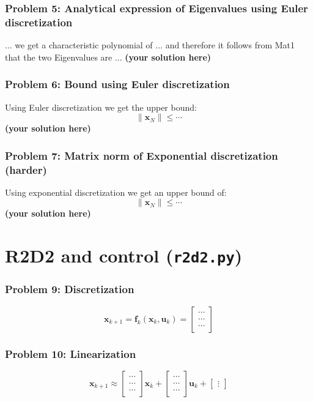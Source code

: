 \documentclass[12pt,twoside]{article}
\newcommand\redt[1]{ {\textcolor[rgb]{0.60, 0.00, 0.00}{\textbf{ #1} } } }
\newcommand{\m}[1]{\boldsymbol{ #1}}
\newcommand{\yoursolution}{ \redt{(your solution here) } }
\begin{document}
\subsubsection*{{\color{red}Problem 5:  Analytical expression of Eigenvalues using Euler discretization}}

... we get a characteristic polynomial of ... and therefore it follows from Mat1 that the two Eigenvalues are ... 
\yoursolution

\subsubsection*{{\color{red}Problem 6:  Bound using Euler discretization}}

	Using Euler discretization we get the upper bound:
	$$
\| \m x_N \| \leq \cdots
$$
\yoursolution
	
\subsubsection*{{\color{red}Problem 7:  Matrix norm of Exponential discretization (harder)}}
	
Using exponential discretization we get an upper bound of:
		$$
		\| \m x_N \| \leq \cdots
		$$
		\yoursolution
	
\section{R2D2 and control (\texttt{r2d2.py})}
\subsubsection*{{\color{red}Problem 9:  Discretization}}

	$$
	\m x_{k+1} = \m f_k(\m x_k, \m u_k) = \begin{bmatrix} \cdots \\ \cdots \\ \cdots \end{bmatrix}$$

\subsubsection*{{\color{red}Problem 10:  Linearization}}
	
$$
		\m x_{k+1} \approx \begin{bmatrix} \cdots \\ \cdots \\ \cdots \end{bmatrix} \m x_k + 
		\begin{bmatrix} \cdots \\ \cdots \\ \cdots \end{bmatrix} \m u_k +  
		\begin{bmatrix} \vdots \end{bmatrix} 
$$
	
\end{document}
